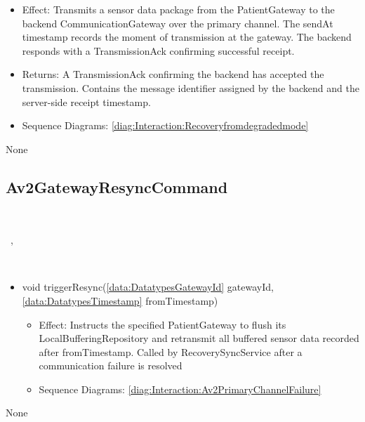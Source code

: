 \begin{description}
\begin{itemize}[noitemsep,nolistsep,leftmargin=-.25cm]
        \begin{itemize}[noitemsep,nolistsep]
           \item Effect: Transmits a sensor data package from the PatientGateway to the backend CommunicationGateway over the primary channel. The sendAt timestamp records the moment of transmission at the gateway. The backend responds with a TransmissionAck confirming successful receipt. 
           \item Returns: A TransmissionAck confirming the backend has accepted the transmission. Contains the message identifier assigned by the backend and the server-side receipt timestamp.
           \item Sequence Diagrams: \cref{diag:Interaction:Recoveryfromdegradedmode}
        \end{itemize}
    \end{itemize}
      \item[Diagrams:] None
    \end{description}

  \subsection{Av2GatewayResyncCommand}\label{int:InterfacesAv2GatewayResyncCommand}
    \begin{description}
      \item[Provided by:] \iconcomponent{}~
      \item[Required by:] \iconcomponent{}~, \iconcomponent{}~ 
      \item[Operations:] ~
    \begin{itemize}[noitemsep,nolistsep,leftmargin=-.25cm]
      \item \textsf{void triggerResync(\ref{data:DatatypesGatewayId} gatewayId, \ref{data:DatatypesTimestamp} fromTimestamp)}
        \begin{itemize}[noitemsep,nolistsep]
           \item Effect: Instructs the specified PatientGateway to flush its LocalBufferingRepository and retransmit all buffered sensor data recorded after fromTimestamp. Called by RecoverySyncService after a communication failure is resolved 
           \item Sequence Diagrams: \cref{diag:Interaction:Av2PrimaryChannelFailure}
        \end{itemize}
    \end{itemize}
      \item[Diagrams:] None
    \end{description}

